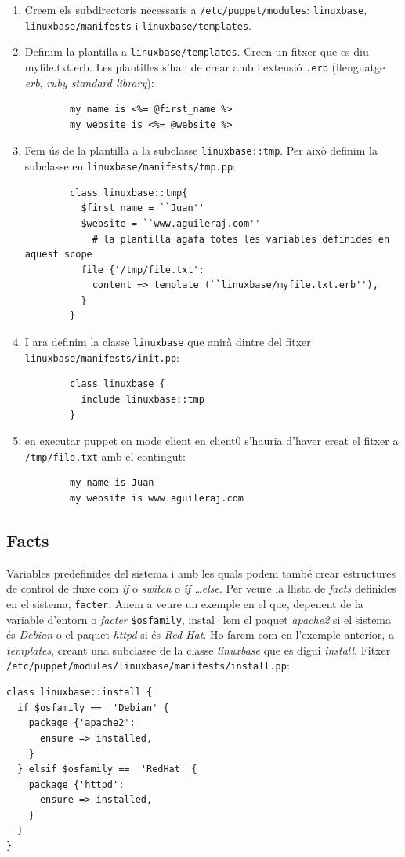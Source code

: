 \documentclass[a4paper]{article}
\begin{document}
\begin{enumerate}
	\item Creem els subdirectoris necessaris a \verb+/etc/puppet/modules+: \verb+linuxbase+, \verb+linuxbase/manifests+ i \verb+linuxbase/templates+.
	\item Definim la plantilla a \verb+linuxbase/templates+. Creen un fitxer que es diu myfile.txt.erb. Les plantilles s'han de crear amb l'extensió \verb+.erb+ (llenguatge \textit{erb}, \textit{ruby standard library}):
		\begin{verbatim}
		my name is <%= @first_name %>
		my website is <%= @website %>
		\end{verbatim}
	\item Fem ús de la plantilla a la subclasse \verb+linuxbase::tmp+. Per això definim la subclasse en \verb+linuxbase/manifests/tmp.pp+:
		\begin{verbatim}
		class linuxbase::tmp{
		  $first_name = ``Juan''
		  $website = ``www.aguileraj.com''
			# la plantilla agafa totes les variables definides en aquest scope
		  file {'/tmp/file.txt':
		    content => template (``linuxbase/myfile.txt.erb''),
		  }
		}
		\end{verbatim}
	\item I ara definim la classe \verb+linuxbase+ que anirà dintre del fitxer \verb+linuxbase/manifests/init.pp+:
		\begin{verbatim}
		class linuxbase {
		  include linuxbase::tmp
		}
		\end{verbatim}
	\item en executar puppet en mode client en client0 s'hauria d'haver creat el fitxer a \verb+/tmp/file.txt+ amb el contingut:
		\begin{verbatim}
		my name is Juan
		my website is www.aguileraj.com
		\end{verbatim}
\end{enumerate}
\subsection{Facts}
Variables predefinides del sistema i amb les quals podem tamb\'e crear estructures de control de fluxe com \textit{if} o \textit{switch} o \textit{if \ldots else}. Per veure la llista de \textit{facts} definides en el sistema, \verb+facter+. Anem a veure un exemple en el que, depenent de la variable d'entorn o \textit{facter} \verb+$osfamily+, instal·lem el paquet \textit{apache2} si el sistema \'es \textit{Debian} o el paquet \textit{httpd} si \'es \textit{Red Hat}. Ho farem com en l'exemple anterior, a \textit{templates}, creant una subclasse de la classe \textit{linuxbase} que es digui \textit{install}. Fitxer \verb+/etc/puppet/modules/linuxbase/manifests/install.pp+:
\begin{verbatim}
class linuxbase::install {
  if $osfamily ==  'Debian' {
    package {'apache2':
      ensure => installed,
    }
  } elsif $osfamily ==  'RedHat' {
    package {'httpd':
      ensure => installed,
    }
  }
}
\end{verbatim}
\end{document}
